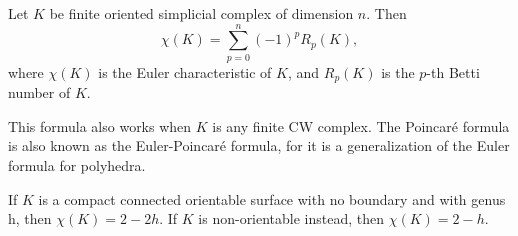 \documentclass[12pt]{article}
\begin{document}
Let $K$ be finite oriented simplicial complex of dimension $n$.  Then $$\chi(K)= \sum_{p=0}^n (-1)^p R_p(K),$$ where $\chi(K)$ is the Euler characteristic of $K$, and $R_{p}(K)$ is the $p$-th Betti number of $K$.

This formula also works when $K$ is any finite CW complex.  The Poincar\'e formula is also known as the Euler-Poincar\'e formula, for it is a generalization of the Euler formula for polyhedra.

If $K$ is a compact connected orientable surface with no boundary and with genus h, then $\chi(K)=2-2h$.  If $K$ is non-orientable instead, then $\chi(K)=2-h$.
\end{document}
